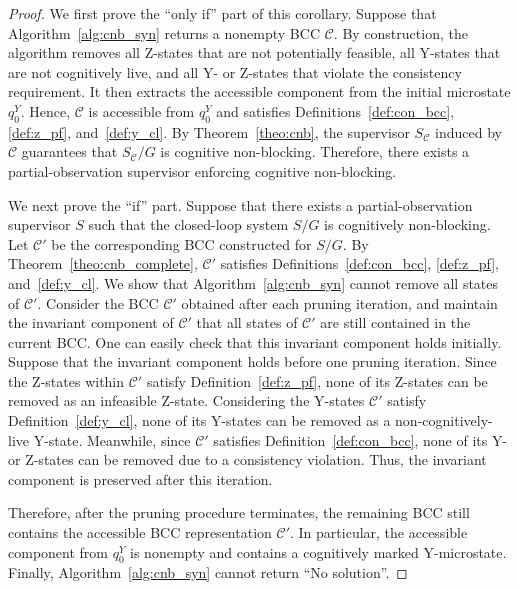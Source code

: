 \documentclass[journal,twoside,web]{ieeecolor}
\begin{document}
\begin{proof}
We first prove the ``only if'' part of this corollary.
Suppose that Algorithm~\ref{alg:cnb_syn} returns a nonempty BCC $\mathcal{C}$. 
By construction, the algorithm removes all Z-states that are not potentially feasible, all Y-states that are not cognitively live, and all Y- or Z-states that violate the consistency requirement. It then extracts the accessible component from the initial microstate $q^Y_0$. 
Hence, $\mathcal{C}$ is accessible from $q^Y_0$ and satisfies Definitions~\ref{def:con_bcc}, \ref{def:z_pf}, and~\ref{def:y_cl}. 
By Theorem~\ref{theo:cnb}, the supervisor $S_{\mathcal{C}}$ induced by $\mathcal{C}$ guarantees that $S_{\mathcal{C}}/G$ is cognitive non-blocking. 
Therefore, there exists a partial-observation supervisor enforcing cognitive non-blocking.

We next prove the ``if'' part. 
Suppose that there exists a partial-observation supervisor $S$ such that the closed-loop system $S/G$ is cognitively non-blocking. 
Let ${\mathcal{C}}'$ be the corresponding BCC constructed for $S / G$. 
By Theorem~\ref{theo:cnb_complete}, ${\mathcal{C}}'$ satisfies Definitions~\ref{def:con_bcc}, \ref{def:z_pf}, and~\ref{def:y_cl}.
%
We show that Algorithm~\ref{alg:cnb_syn} cannot remove all states of ${\mathcal{C}}'$. 
Consider the BCC ${\mathcal{C}}'$ obtained after each pruning iteration, and maintain the invariant component of ${\mathcal{C}}'$ that all states of ${\mathcal{C}}'$ are still contained in the current BCC. 
One can easily check that this invariant component holds initially.
%
Suppose that the invariant component holds before one pruning iteration. 
Since the Z-states within ${\mathcal{C}}'$ satisfy Definition~\ref{def:z_pf}, none of its Z-states can be removed as an infeasible Z-state. 
Considering the Y-states ${\mathcal{C}}'$ satisfy Definition~\ref{def:y_cl}, none of its Y-states can be removed as a non-cognitively-live Y-state. 
Meanwhile, since ${\mathcal{C}}'$ satisfies Definition~\ref{def:con_bcc}, none of its Y- or Z-states can be removed due to a consistency violation. 
Thus, the invariant component is preserved after this iteration.

Therefore, after the pruning procedure terminates, the remaining BCC still contains the accessible BCC representation ${\mathcal{C}}'$. 
In particular, the accessible component from $q^Y_0$ is nonempty and contains a cognitively marked Y-microstate. 
Finally, Algorithm~\ref{alg:cnb_syn} cannot return ``No solution''.
\end{proof}
%
\end{document}
